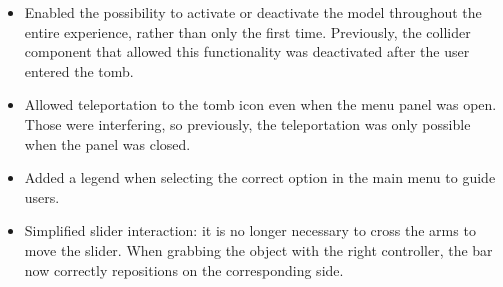 \begin{itemize}
 \item Enabled the possibility to activate or deactivate the model throughout the entire experience, rather than only the first time. Previously, the collider component that allowed this functionality was deactivated after the user entered the tomb.
 \item Allowed teleportation to the tomb icon even when the menu panel was open. Those were interfering, so previously, the teleportation was only possible when the panel was closed.
 \item Added a legend when selecting the correct option in the main menu to guide users.
 \item Simplified slider interaction: it is no longer necessary to cross the arms to move the slider. When grabbing the object with the right controller, the bar now correctly repositions on the corresponding side.
 \end{itemize}




